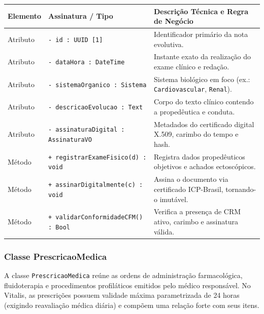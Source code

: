 \begingroup
\small
\noindent\begin{tabularx}{\linewidth}{l >{\raggedright\arraybackslash}p{5.7cm} >{\raggedright\arraybackslash}X}
\toprule
\textbf{Elemento} & \textbf{Assinatura / Tipo} & \textbf{Descrição Técnica e Regra de Negócio} \\
\midrule
Atributo & \texttt{- id : UUID [1]} & Identificador primário da nota evolutiva. \\
Atributo & \texttt{- dataHora : DateTime} & Instante exato da realização do exame clínico e redação. \\
Atributo & \texttt{- sistemaOrganico : Sistema} & Sistema biológico em foco (ex.: \texttt{Cardiovascular}, \texttt{Renal}). \\
Atributo & \texttt{- descricaoEvolucao : Text} & Corpo do texto clínico contendo a propedêutica e conduta. \\
Atributo & \texttt{- assinaturaDigital : AssinaturaVO} & Metadados do certificado digital X.509, carimbo do tempo e hash. \\
\midrule
Método & \texttt{+ registrarExameFisico(d) : void} & Registra dados propedêuticos objetivos e achados ectoscópicos. \\
Método & \texttt{+ assinarDigitalmente(c) : void} & Assina o documento via certificado ICP-Brasil, tornando-o imutável. \\
Método & \texttt{+ validarConformidadeCFM() : Bool} & Verifica a presença de CRM ativo, carimbo e assinatura válida. \\
\bottomrule
\end{tabularx}
\endgroup

\subsubsection{Classe PrescricaoMedica}
A classe \texttt{PrescricaoMedica} reúne as ordens de administração farmacológica, fluidoterapia e procedimentos profiláticos emitidos pelo médico responsável. No Vitalis, as prescrições possuem validade máxima parametrizada de 24 horas (exigindo reavaliação médica diária) e compõem uma relação forte com seus itens.

